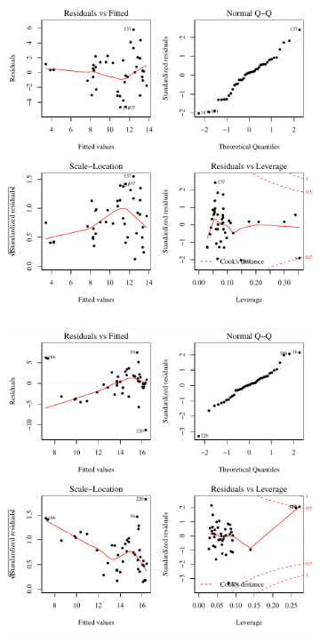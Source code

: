 \subfiguretop
\begin{landscape}
	\begin{figure}
		\begin{subfigure}{0.7\textwidth}
			\centering
			\includegraphics[width=\tableCustomSize]{"Figures/Results_DSR/Stochastic/Conc Model lm-fit D101C"}
		\end{subfigure}%
		\begin{subfigure}{0.7\textwidth}
			\centering
			\includegraphics[width=\tableCustomSize]{"Figures/Results_DSR/Stochastic/Conc Model lm-fit D106C"}

\end{subfigure}
\end{figure}
\end{landscape}
